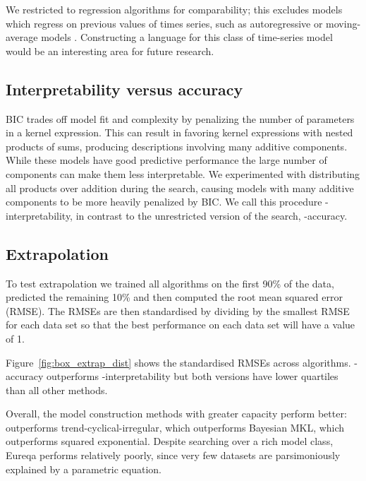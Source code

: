We restricted to regression algorithms for comparability; this excludes models which regress on previous values of times series, such as autoregressive or moving-average models \citep[e.g.][]{box2013time}.
Constructing a language for this class of time-series model would be an interesting area for future research.



\subsection{Interpretability versus accuracy}

BIC trades off model fit and complexity by penalizing the number of parameters in a kernel expression.
This can result in \procedurename{} favoring kernel expressions with nested products of sums, producing descriptions involving many additive components.
While these models have good predictive performance the large number of components can make them less interpretable.
We experimented with distributing all products over addition during the search, causing models with many additive components to be more heavily penalized by BIC.
We call this procedure \procedurename{}-interpretability, in contrast to the unrestricted version of the search, \procedurename{}-accuracy.



\subsection{Extrapolation}

To test extrapolation we trained all algorithms on the first 90\% of the data, predicted the remaining 10\% and then computed the root mean squared error (RMSE).
The RMSEs are then standardised by dividing by the smallest RMSE for each data set so that the best performance on each data set will have a value of 1.

Figure~\ref{fig:box_extrap_dist} shows the standardised RMSEs across algorithms.
\procedurename{}-accuracy outperforms \procedurename{}-interpretability but both versions have lower quartiles than all other methods.

Overall, the model construction methods with greater capacity perform better: \procedurename{} outperforms trend-cyclical-irregular, which outperforms Bayesian MKL, which outperforms squared exponential.
Despite searching over a rich model class, Eureqa performs relatively poorly, since very few datasets are parsimoniously explained by a parametric equation.

